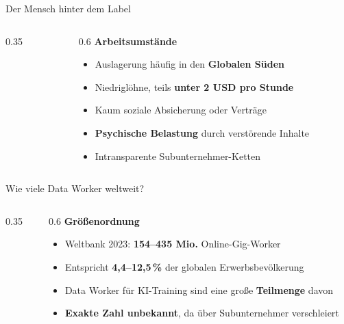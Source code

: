 \begin{frame}{Der Mensch hinter dem Label}
\begin{columns}
\begin{column}{0.35\linewidth}
\centering
{}
\end{column}
\begin{column}{0.6\linewidth}
\textbf{Arbeitsumstände}
\begin{itemize}
  \item Auslagerung häufig in den \textbf{Globalen Süden}
  \item Niedriglöhne, teils \textbf{unter 2 USD pro Stunde}
  \item Kaum soziale Absicherung oder Verträge
  \item \textbf{Psychische Belastung} durch verstörende Inhalte
  \item Intransparente Subunternehmer-Ketten
\end{itemize}
\end{column}
\end{columns}
\end{frame}

\begin{frame}{Wie viele Data Worker weltweit?}
\begin{columns}
\begin{column}{0.35\linewidth}
\centering
{}
\end{column}
\begin{column}{0.6\linewidth}
\textbf{Größenordnung}
\begin{itemize}
  \item Weltbank 2023: \textbf{154--435 Mio.} Online-Gig-Worker
  \item Entspricht \textbf{4,4--12,5\,\%} der globalen Erwerbsbevölkerung
  \item Data Worker für KI-Training sind eine große \textbf{Teilmenge} davon
  \item \textbf{Exakte Zahl unbekannt}, da über Subunternehmer verschleiert
\end{itemize}
\end{column}
\end{columns}
\end{frame}



\makequestionspage{\FRAGENIMAGE}